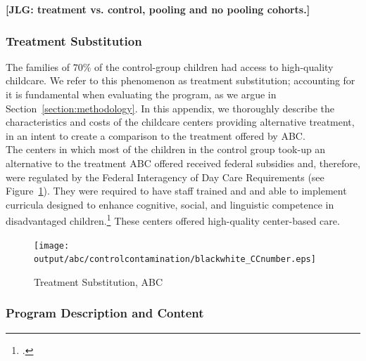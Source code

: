 \noindent \textbf{[JLG: treatment vs. control, pooling and no pooling cohorts.]}\\

\subsubsection{Treatment Substitution}

\noindent The families of $70\%$ of the control-group children had access to high-quality childcare. We refer to this phenomenon as treatment substitution; accounting for it is fundamental when evaluating the program, as we argue in Section~\ref{section:methodology}. In this appendix, we thoroughly describe the characteristics and costs of the childcare centers providing alternative treatment, in an intent to create a comparison to the treatment offered by ABC.\\

\noindent The centers in which most of the children in the control group took-up an alternative to the treatment ABC offered received federal subsidies and, therefore, were regulated by the Federal Interagency of Day Care Requirements (see Figure~\ref{fig:cc}). They were required to have staff trained and and able to implement curricula designed to enhance cognitive, social, and linguistic competence in disadvantaged children.\footnote{\citet{Burchinal_etal_1989_CD_Daycare-Pre-K-Dev}.} These centers offered high-quality center-based care.

\begin{center}
	\begin{figure}[H]
		\caption{Treatment Substitution, ABC}
		\label{fig:cc}
		\centering
		\texttt{[image: output/abc/controlcontamination/blackwhite\_CCnumber.eps]}
		
		\footnotesize

	\end{figure}
\end{center}

\subsubsection{Program Description and Content}

